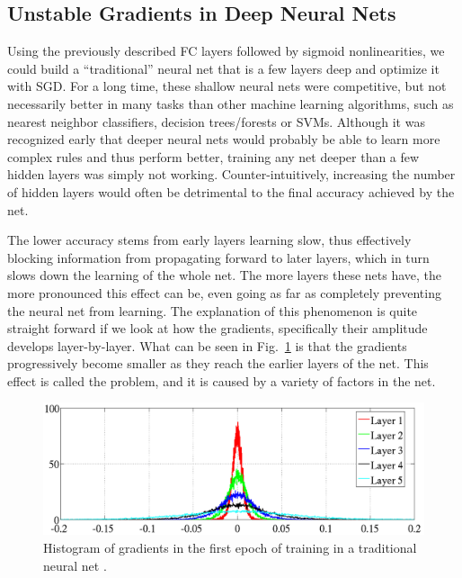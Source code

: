 		\subsection{Unstable Gradients in Deep Neural Nets}
		
			Using the previously described \ac{FC} layers followed by sigmoid nonlinearities, we could build a ``traditional'' neural net that is a few layers deep and optimize it with \ac{SGD}.
			For a long time, these shallow neural nets were competitive, but not necessarily better in many tasks than other machine learning algorithms, such as nearest neighbor classifiers, decision trees/forests or \acp{SVM}.
			Although it was recognized early that deeper neural nets would probably be able to learn more complex rules and thus perform better, training any net deeper than a few hidden layers was simply not working.
			Counter-intuitively, increasing the number of hidden layers would often be detrimental to the final accuracy achieved by the net.
			
			The lower accuracy stems from early layers learning slow, thus effectively blocking information from propagating forward to later layers, which in turn slows down the learning of the whole net.
			The more layers these nets have, the more pronounced this effect can be, even going as far as completely preventing the neural net from learning.
			The explanation of this phenomenon is quite straight forward if we look at how the gradients, specifically their amplitude develops layer-by-layer.
			What can be seen in Fig.~\ref{fig:vanishing_gradients} is that the gradients progressively become smaller as they reach the earlier layers of the net.
			This effect is called the  problem, and it is caused by a variety of factors in the net.
			
			\begin{figure}[ht]
				\centering
				\includegraphics[width=0.8\linewidth]{figures/02_deep_learning/vanishing_gradients/vanishing_gradients.png}
				\caption[Histogram of vanishing gradients]{Histogram of gradients in the first epoch of training in a traditional neural net \cite{deep_net_init}.}
				\label{fig:vanishing_gradients}
			\end{figure}
			
